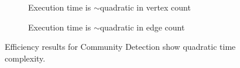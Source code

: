\begin{figure}[htbp]
    \centering
    \begin{subfigure}[b]{0.45\textwidth}  %
        \centering
        \caption{Execution time is $\sim$quadratic in vertex count}
        \label{fig:vertex-efficency}
    \end{subfigure}
    \hfill
    \begin{subfigure}[b]{0.45\textwidth}  %
        \centering
        \caption{Execution time is $\sim$quadratic in edge count}
        \label{fig:edge-efficency}
    \end{subfigure}
    \caption{Efficiency results for Community Detection show quadratic time complexity.}
    \label{fig:cd-results-efficency}
\end{figure}